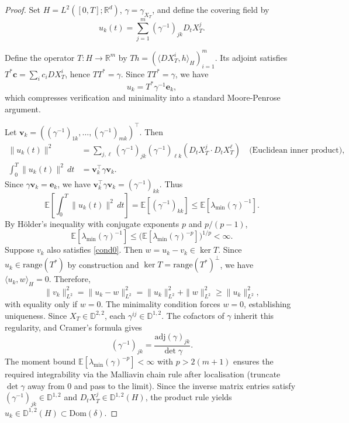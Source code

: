 \documentclass[]{interact}
\newcommand{\1}{\mathbf{1}}
\theoremstyle{plain}%
\theoremstyle{definition}
\theoremstyle{remark}
\numberwithin{equation}{section}
\begin{document}
\begin{proof}
Set $H = L^2([0, T]; \mathbb{R}^d)$, $\gamma = \gamma_{X_T}$, and define the covering field by
\[
u_k(t) = \sum_{j=1}^m \left(\gamma^{-1}\right)_{jk} D_t X_T^j.
\]

Define the operator $T: H \to \mathbb{R}^m$ by $Th = (\langle DX_T^i, h\rangle_H)_{i=1}^m$. Its adjoint satisfies $T^*\mathbf{c} = \sum_i c_i DX_T^i$, hence $TT^* = \gamma$. Since $TT^* = \gamma$, we have
\[
u_k = T^*\gamma^{-1}\mathbf{e}_k,
\]
which compresses verification and minimality into a standard Moore-Penrose argument.

Let $\mathbf{v}_k = (\left(\gamma^{-1}\right)_{1k}, \ldots, \left(\gamma^{-1}\right)_{mk})^\top$. Then
\begin{align}
\|u_k(t)\|^2 &= \sum_{j,\ell} \left(\gamma^{-1}\right)_{jk} \left(\gamma^{-1}\right)_{\ell k} (D_t X_T^j \cdot D_t X_T^\ell) \quad \text{(Euclidean inner product)},\\
\int_0^T \|u_k(t)\|^2 \, dt &= \mathbf{v}_k^\top \gamma \mathbf{v}_k.
\end{align}
Since $\gamma \mathbf{v}_k = \mathbf{e}_k$, we have $\mathbf{v}_k^\top \gamma \mathbf{v}_k = \left(\gamma^{-1}\right)_{kk}$. Thus
\[
\mathbb{E}\left[\int_0^T \|u_k(t)\|^2 \, dt\right] = \mathbb{E}[\left(\gamma^{-1}\right)_{kk}] \leq \mathbb{E}[\lambda_{\min}(\gamma)^{-1}].
\]
By H\"older’s inequality with conjugate exponents \(p\) and \({p}/{(p-1)}\),
\[
\mathbb{E}\!\left[\lambda_{\min}(\gamma)^{-1}\right]
\le \Big(\mathbb{E}\!\left[\lambda_{\min}(\gamma)^{-p}\right]\Big)^{1/p}
< \infty .
\]
%
Suppose $v_k$ also satisfies \eqref{cond0}. Then $w = u_k - v_k \in \ker T$. Since $u_k \in \text{range}(T^*)$ by construction and $\ker T = \text{range}(T^*)^\perp$, we have $\langle u_k, w \rangle_H = 0$. Therefore,
\[
\|v_k\|^2_{L^2} = \|u_k - w\|^2_{L^2} = \|u_k\|^2_{L^2} + \|w\|^2_{L^2} \geq \|u_k\|^2_{L^2},
\]
with equality only if $w = 0$. The minimality condition forces $w = 0$, establishing uniqueness.
%
Since $X_T \in \mathbb{D}^{2,2}$, each $\gamma^{ij} \in \mathbb{D}^{1,2}$. The cofactors of $\gamma$ inherit this regularity, and Cramer's formula gives
\[
\left(\gamma^{-1}\right)_{jk} = \frac{\text{adj}(\gamma)_{jk}}{\det \gamma}.
\]
The moment bound $\mathbb{E}[\lambda_{\min}(\gamma)^{-p}] < \infty$ with $p > 2(m+1)$ ensures the required integrability via the Malliavin chain rule after localisation (truncate $\det \gamma$ away from 0 and pass to the limit). Since the inverse matrix entries satisfy $\left(\gamma^{-1}\right)_{jk} \in \mathbb{D}^{1,2}$ and $D_t X_T^j \in \mathbb{D}^{1,2}(H)$, the product rule yields $u_k \in \mathbb{D}^{1,2}(H) \subset \text{Dom}(\delta)$.

\end{proof}
\end{document}
